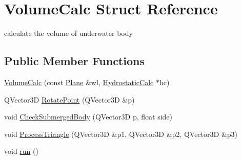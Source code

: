 \hypertarget{structVolumeCalc}{\section{Volume\-Calc Struct Reference}
\label{structVolumeCalc}
}


calculate the volume of underwater body  


\subsection*{Public Member Functions}
\begin{DoxyCompactItemize}
\item 
\hyperlink{structVolumeCalc_a21a672444dafcae8293fe2b8be4dc071}{Volume\-Calc} (const \hyperlink{classShipCAD_1_1Plane}{Plane} \&wl, \hyperlink{classShipCAD_1_1HydrostaticCalc}{Hydrostatic\-Calc} $\ast$hc)
\item 
Q\-Vector3\-D \hyperlink{structVolumeCalc_adc01f5f156dccfc889a3ab8585341fa4}{Rotate\-Point} (Q\-Vector3\-D \&p)
\item 
void \hyperlink{structVolumeCalc_a76b82a9e1e96365185536a8fc799e235}{Check\-Submerged\-Body} (Q\-Vector3\-D p, float side)
\item 
void \hyperlink{structVolumeCalc_aa618d547fd891f960f5ca1a80e4fb429}{Process\-Triangle} (Q\-Vector3\-D \&p1, Q\-Vector3\-D \&p2, Q\-Vector3\-D \&p3)
\item 
void \hyperlink{structVolumeCalc_a9dc91b671e810b1bd4236565a89caf05}{run} ()
\end{DoxyCompactItemize}
